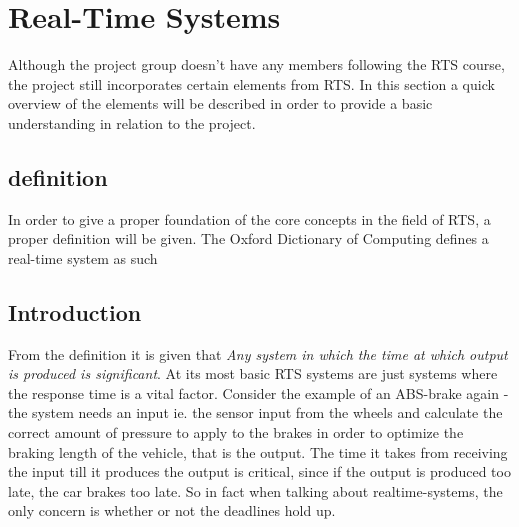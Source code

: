 \section{Real-Time Systems}
Although the project group doesn't have any members following the RTS course, the project
still incorporates certain elements from RTS. In this section a quick overview of the elements will be described
in order to provide a basic understanding in relation to the project.
\subsection{definition}
In order to give a proper foundation of the core concepts in the field of RTS, a proper definition will be given.
The Oxford Dictionary of Computing\citep{daintith2008dictionary} defines a real-time system as such
\subsection{Introduction}
From the definition it is given that \textit{Any system in which the time at which output is produced is significant}. At its most basic RTS
systems are just systems where the response time is a vital factor. Consider the example of an ABS-brake again - the system needs an input
ie. the sensor input from the wheels and calculate the correct amount of pressure to apply to the brakes in order to optimize the braking
length of the vehicle, that is the output. The time it takes from receiving the input till it produces the output is critical,
since if the output is produced too late, the car brakes too late. So in fact when talking about realtime-systems, the only concern is whether
or not the deadlines hold up.
